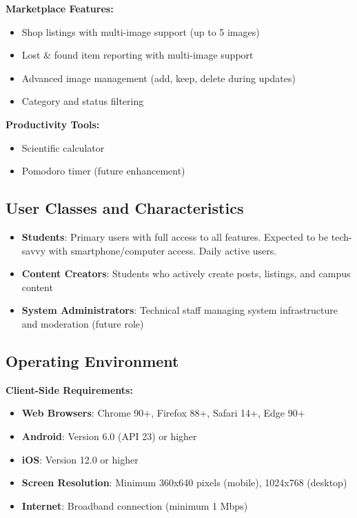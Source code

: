 \documentclass[12pt,a4paper]{article}
\begin{document}
\textbf{Marketplace Features:}
\begin{itemize}
    \item Shop listings with multi-image support (up to 5 images)
    \item Lost \& found item reporting with multi-image support
    \item Advanced image management (add, keep, delete during updates)
    \item Category and status filtering
\end{itemize}

\textbf{Productivity Tools:}
\begin{itemize}
    \item Scientific calculator
    \item Pomodoro timer (future enhancement)
\end{itemize}

\subsection{User Classes and Characteristics}
\begin{itemize}
    \item \textbf{Students}: Primary users with full access to all features. Expected to be tech-savvy with smartphone/computer access. Daily active users.
    \item \textbf{Content Creators}: Students who actively create posts, listings, and campus content
    \item \textbf{System Administrators}: Technical staff managing system infrastructure and moderation (future role)
\end{itemize}

\subsection{Operating Environment}
\textbf{Client-Side Requirements:}
\begin{itemize}
    \item \textbf{Web Browsers}: Chrome 90+, Firefox 88+, Safari 14+, Edge 90+
    \item \textbf{Android}: Version 6.0 (API 23) or higher
    \item \textbf{iOS}: Version 12.0 or higher
    \item \textbf{Screen Resolution}: Minimum 360x640 pixels (mobile), 1024x768 (desktop)
    \item \textbf{Internet}: Broadband connection (minimum 1 Mbps)
\end{itemize}
\end{document}
